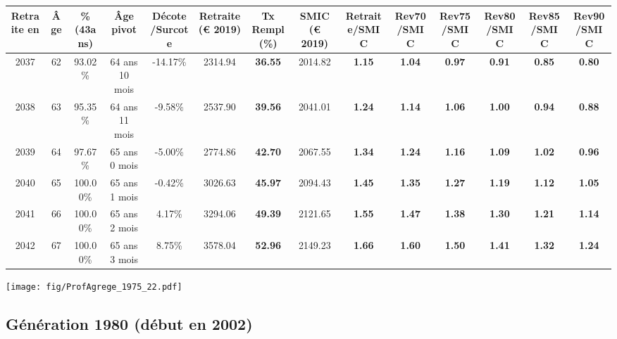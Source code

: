 \begin{adjustbox}{max width=\textwidth} 
\begin{tabular}[htb]{|c|c||c|c|c||c|c||c||c|c|c|c|c|c|} 
\hline 
 Retraite en &  Âge &  \%(43ans) &  Âge pivot &  Décote/Surcote &  Retraite (\euro{} 2019) &  Tx Rempl(\%) &  SMIC (\euro{} 2019) &  Retraite/SMIC &  Rev70/SMIC &  Rev75/SMIC &  Rev80/SMIC &  Rev85/SMIC &  Rev90/SMIC \\ 
\hline \hline 
 2037 &  62 &  93.02\% &  64 ans 10 mois &  -14.17\% &  2314.94 &  {\bf 36.55} &  2014.82 &  {\bf 1.15} &  {\bf 1.04} &  {\bf {\color{red} 0.97}} &  {\bf {\color{red} 0.91}} &  {\bf {\color{red} 0.85}} &  {\bf {\color{red} 0.80}} \\ 
\hline 
 2038 &  63 &  95.35\% &  64 ans 11 mois &  -9.58\% &  2537.90 &  {\bf 39.56} &  2041.01 &  {\bf 1.24} &  {\bf 1.14} &  {\bf 1.06} &  {\bf {\color{red} 1.00}} &  {\bf {\color{red} 0.94}} &  {\bf {\color{red} 0.88}} \\ 
\hline 
 2039 &  64 &  97.67\% &  65 ans 0 mois &  -5.00\% &  2774.86 &  {\bf 42.70} &  2067.55 &  {\bf 1.34} &  {\bf 1.24} &  {\bf 1.16} &  {\bf 1.09} &  {\bf 1.02} &  {\bf {\color{red} 0.96}} \\ 
\hline 
 2040 &  65 &  100.00\% &  65 ans 1 mois &  -0.42\% &  3026.63 &  {\bf 45.97} &  2094.43 &  {\bf 1.45} &  {\bf 1.35} &  {\bf 1.27} &  {\bf 1.19} &  {\bf 1.12} &  {\bf 1.05} \\ 
\hline 
 2041 &  66 &  100.00\% &  65 ans 2 mois &  4.17\% &  3294.06 &  {\bf 49.39} &  2121.65 &  {\bf 1.55} &  {\bf 1.47} &  {\bf 1.38} &  {\bf 1.30} &  {\bf 1.21} &  {\bf 1.14} \\ 
\hline 
 2042 &  67 &  100.00\% &  65 ans 3 mois &  8.75\% &  3578.04 &  {\bf 52.96} &  2149.23 &  {\bf 1.66} &  {\bf 1.60} &  {\bf 1.50} &  {\bf 1.41} &  {\bf 1.32} &  {\bf 1.24} \\ 
\hline 
\hline 
\end{tabular} 
\end{adjustbox} 
 
 \vspace{0.1cm} 

 \begin{center}\texttt{[image: fig/ProfAgrege\_1975\_22.pdf]}\end{center} \label{fig/ProfAgrege_1975_22.pdf} 

\newpage 
 
\subsection{Génération 1980 (début en 2002)} 

